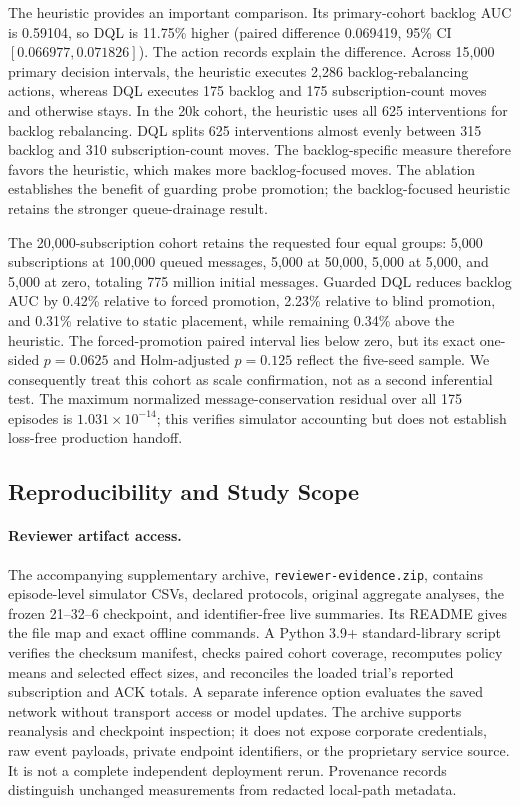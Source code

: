 The heuristic provides an important comparison. Its primary-cohort backlog AUC
is 0.59104, so DQL is 11.75\% higher (paired difference 0.069419, 95\% CI
$[0.066977,0.071826]$). The action records explain the difference. Across 15,000
primary decision intervals, the heuristic executes 2,286 backlog-rebalancing
actions, whereas DQL executes 175 backlog and 175 subscription-count moves and
otherwise stays. In the 20k cohort, the heuristic uses all 625 interventions for backlog rebalancing. DQL splits
625 interventions almost evenly between 315 backlog and 310 subscription-count moves. The backlog-specific measure therefore favors the heuristic, which makes
more backlog-focused moves.
The ablation establishes the benefit of guarding probe promotion; the
backlog-focused heuristic retains the stronger queue-drainage result.

The 20,000-subscription cohort retains the requested four equal groups:
5,000 subscriptions at 100,000 queued messages, 5,000 at 50,000, 5,000 at
5,000, and 5,000 at zero, totaling 775 million initial messages. Guarded DQL
reduces backlog AUC by 0.42\% relative to forced promotion, 2.23\% relative to
blind promotion, and 0.31\% relative to static placement, while remaining
0.34\% above the heuristic. The forced-promotion paired interval lies below
zero, but its exact one-sided $p=0.0625$ and Holm-adjusted $p=0.125$ reflect the
five-seed sample. We consequently treat this cohort as scale confirmation, not
as a second inferential test. The maximum normalized message-conservation
residual over all 175 episodes is $1.031\times10^{-14}$; this verifies simulator
accounting but does not establish loss-free production handoff.
\FloatBarrier

\subsection{Reproducibility and Study Scope}

\paragraph{Reviewer artifact access.}
The accompanying supplementary archive, \texttt{reviewer-evidence.zip},
contains episode-level simulator CSVs, declared protocols, original aggregate
analyses, the frozen 21--32--6 checkpoint, and identifier-free live summaries.
Its README gives the file map and exact offline commands. A Python 3.9+
standard-library script verifies the checksum manifest, checks paired cohort
coverage, recomputes policy means and selected effect sizes, and reconciles
the loaded trial's reported subscription and ACK totals. A separate inference
option evaluates the saved network without transport access or model updates.
The archive supports reanalysis and checkpoint inspection; it does not expose
corporate credentials, raw event payloads, private endpoint identifiers, or
the proprietary service source. It is not a complete independent deployment
rerun. Provenance records distinguish unchanged measurements from redacted
local-path metadata.

